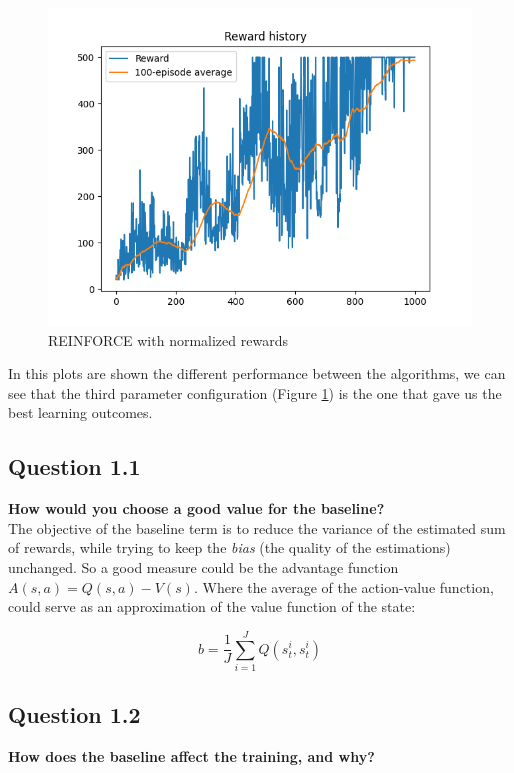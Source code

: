 \documentclass[12pt]{article}
\begin{document}
\begin{figure}[ht]
\begin{minipage}{0.33\textwidth}
     \includegraphics[width=0.9\linewidth]{exercise-5/plots/task-1c.png}
     \caption{REINFORCE with normalized rewards}
     \label{fig:task-1c}
   \end{minipage}
\end{figure}

In this plots are shown the different performance between the algorithms, we can see that the third parameter configuration (Figure \ref{fig:task-1c}) is the one that gave us the best learning outcomes.

\subsection{Question 1.1}
\textbf{How would you choose a good value for the baseline?}\\

The objective of the baseline term is to reduce the variance of the estimated sum of rewards, while trying to keep the \textit{bias} (the quality of the estimations) unchanged. So a good measure could be the advantage function $A(s,a) = Q(s,a)-V(s)$. Where the average of the action-value function, could serve as an approximation of the value function of the state:

\begin{equation}
    b = \frac{1}{J}\sum_{i=1}^J Q(s^i_t, s^i_t)
\end{equation}

\subsection{Question 1.2}
\textbf{How does the baseline affect the training, and why?}\\
\end{document}
